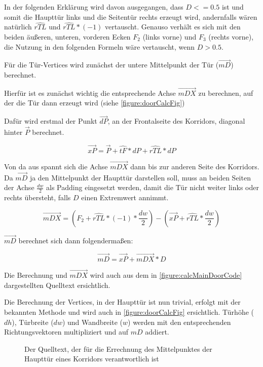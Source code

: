 In der folgenden Erklärung wird davon ausgegangen, dass $D <= 0.5$ ist und somit die Haupttür links und die Seitentür rechts erzeugt wird, andernfalls  wären natürlich $\hat{rTL}$ und $\hat{rTL} * (-1)$ vertauscht. Genauso verhält es sich mit den beiden äußeren, unteren, vorderen Ecken $F_2$ (links vorne) und $F_3$ (rechts vorne), die Nutzung in den folgenden Formeln wäre vertauscht, wenn $D > 0.5$.

Für die Tür-Vertices wird zunächst der untere Mittelpunkt der Tür ($\vec{mD}$) berechnet.

Hierfür ist es zunächst wichtig die entsprechende Achse $\vec{mDX}$ zu berechnen, auf der die Tür dann erzeugt wird (siehe \autoref{figure:doorCalcFig})

Dafür wird erstmal der Punkt $\vec{dP}$, an der Frontalseite des Korridors, diagonal hinter $\vec{P}$ berechnet.

$$\vec{xP} = \vec{P} + \hat{tF} * dP + \hat{rTL} * dP$$

Von da aus spannt sich die Achse $\vec{mDX}$ dann bis zur anderen Seite des Korridors. Da $\vec{mD}$ ja den Mittelpunkt der Haupttür darstellen soll, muss an beiden Seiten der Achse $\frac{dw}{2}$ als Padding eingesetzt werden, damit die Tür nicht weiter links oder rechts übersteht, falls $D$ einen Extremwert annimmt.

$$ \vec{mDX} = (F_2 + \hat{rTL} * (-1) * \frac{dw}{2}) -
(\vec{xP} + \hat{rTL} * \frac{dw}{2})$$

$\vec{mD}$ berechnet sich dann folgendermaßen:

$$ \vec{mD} = \vec{xP} + \vec{mDX} * D$$

Die Berechnung und $\vec{mDX}$ wird auch aus dem in \autoref{figure:calcMainDoorCode}
dargestellten Quelltext ersichtlich. %

Die Berechnung der Vertices, in der Haupttür ist nun trivial, erfolgt mit der bekannten Methode und wird auch in \autoref{figure:doorCalcFig} ersichtlich. Türhöhe ($dh$), Türbreite ($dw$) und Wandbreite ($w$) werden mit den entsprechenden Richtungsvektoren multipliziert und auf $mD$ addiert.

\begin{figure}[H]
    \centering
    \caption{Der Quelltext, der für die Errechnung des Mittelpunktes der Haupttür eines Korridors verantwortlich ist}
    \label{figure:calcMainDoorCode}
\end{figure}

